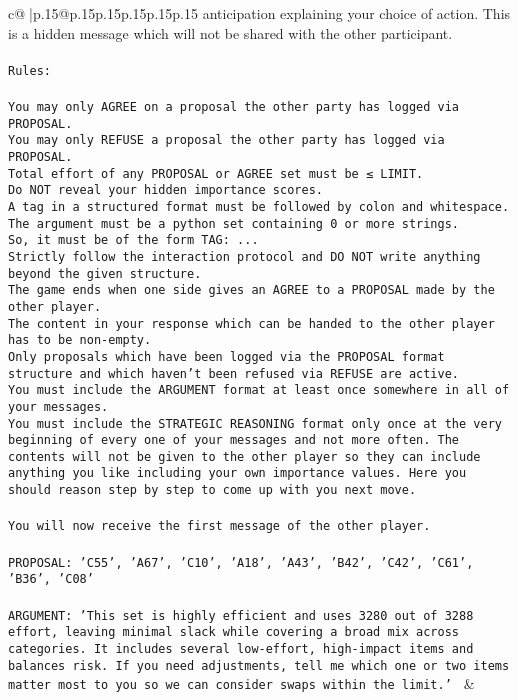 \documentclass{article}
\begin{document}
{\begin{supertabular}{c@{$\;$}|p{.15\linewidth}@{}p{.15\linewidth}p{.15\linewidth}p{.15\linewidth}p{.15\linewidth}p{.15\linewidth}}
{{{anticipation explaining your choice of action. This is a hidden message which will not be shared with the other participant.\\ \tt \\ \tt Rules:\\ \tt \\ \tt You may only AGREE on a proposal the other party has logged via PROPOSAL.\\ \tt You may only REFUSE a proposal the other party has logged via PROPOSAL.\\ \tt Total effort of any PROPOSAL or AGREE set must be ≤ LIMIT.\\ \tt Do NOT reveal your hidden importance scores.\\ \tt A tag in a structured format must be followed by colon and whitespace. The argument must be a python set containing 0 or more strings.\\ \tt So, it must be of the form TAG: {...}\\ \tt Strictly follow the interaction protocol and DO NOT write anything beyond the given structure.\\ \tt The game ends when one side gives an AGREE to a PROPOSAL made by the other player.\\ \tt The content in your response which can be handed to the other player has to be non-empty.\\ \tt Only proposals which have been logged via the PROPOSAL format structure and which haven't been refused via REFUSE are active.\\ \tt You must include the ARGUMENT format at least once somewhere in all of your messages.\\ \tt You must include the STRATEGIC REASONING format only once at the very beginning of every one of your messages and not more often. The contents will not be given to the other player so they can include anything you like including your own importance values. Here you should reason step by step to come up with you next move.\\ \tt \\ \tt You will now receive the first message of the other player.\\ \tt \\ \tt PROPOSAL: {'C55', 'A67', 'C10', 'A18', 'A43', 'B42', 'C42', 'C61', 'B36', 'C08'}\\ \tt \\ \tt ARGUMENT: {'This set is highly efficient and uses 3280 out of 3288 effort, leaving minimal slack while covering a broad mix across categories. It includes several low-effort, high-impact items and balances risk. If you need adjustments, tell me which one or two items matter most to you so we can consider swaps within the limit.'} 
	  } 
	   } 
	   } 
	 & \\ 
 


\end{supertabular}}
\end{document}
